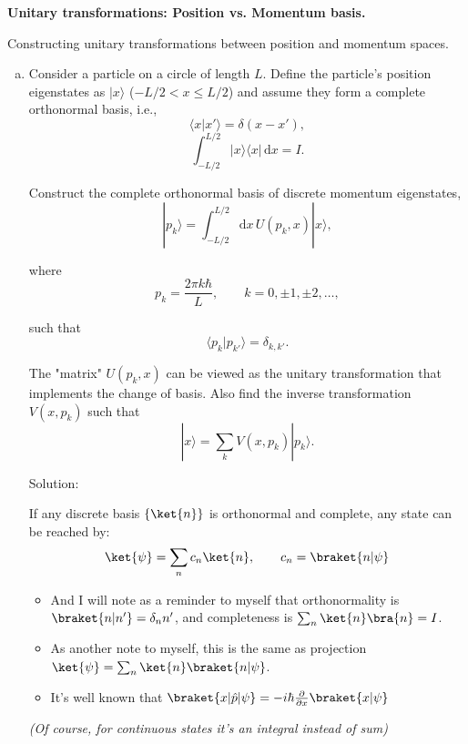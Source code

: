 \begin{homeworkProblem}
    \textbf{Unitary transformations: Position vs. Momentum basis.}

    Constructing unitary transformations between position and momentum spaces.

    \begin{enumerate}[(a)]
        \item Consider a particle on a circle of length $L$. Define the particle's position eigenstates as $|x\rangle$ ($-L/2 < x \leq L/2$) and assume they form a complete orthonormal basis, i.e.,
            \[ \langle x|x'\rangle = \delta(x-x'), \]
            \[ \int_{-L/2}^{L/2} |x\rangle\langle x|\, \mathrm{d}x = I. \]

            Construct the complete orthonormal basis of discrete momentum eigenstates,
            \[ |p_k\rangle = \int_{-L/2}^{L/2} \mathrm{d}x\, U(p_k,x)|x\rangle, \]

            where
            \[ p_k = \frac{2\pi k\hbar}{L}, \qquad k=0,\pm1,\pm2,\ldots, \]

            such that
            \[ \langle p_k|p_{k'}\rangle = \delta_{k,k'}. \]

            The "matrix" $U(p_k,x)$ can be viewed as the unitary transformation that implements the change of basis. Also find the inverse transformation $V(x,p_k)$ such that
            \[ |x\rangle = \sum_k V(x,p_k)|p_k\rangle. \]

            \begin{callout}{Solution:}

                If any discrete basis $\{ \ket{n} \}$ is orthonormal and complete, any state can be reached by:
                \begin{align*}
                    \ket{\psi} = \sum_n c_n \ket{n}, \qquad c_n = \braket{n|\psi}
                \end{align*}

                \begin{itemize}
                    \item And I will note as a reminder to myself that orthonormality is $\braket{n|n'}=\delta_nn'$, and completeness is $\sum_n \ket{n}\bra{n} = I$.
                    \item As another note to myself, this is the same as projection $\ket{\psi} = \sum_n \ket{n}\braket{n|\psi}$.
                    \item It's well known that $\braket{x|\hat{p}|\psi} = -i\hbar \frac{\partial}{\partial x} \braket{x|\psi}$
                \end{itemize}
                \textit{(Of course, for continuous states it's an integral instead of sum)}


\end{callout}
\end{enumerate}
\end{homeworkProblem}
